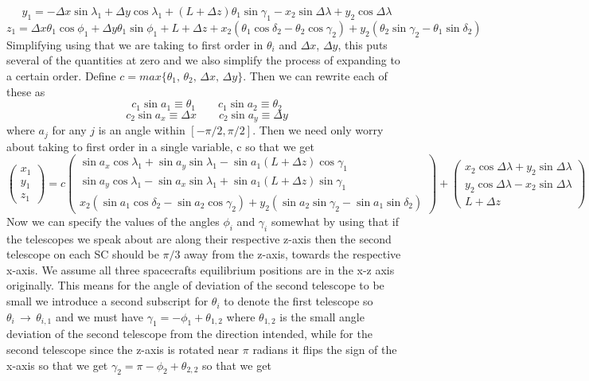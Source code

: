 \documentclass[11pt]{amsart}
\makeatletter
\newcommand{\0}{\varnothing}		%
\DeclareMathOperator*{\goes}{\, \longrightarrow \,}		%
\newcommand{\eq}{\equiv}		%
\newcommand{\1}{!}
\newcommand{\2}{@}
\newcommand{\3}{\#}
\newcommand{\4}{\$}
\newcommand{\5}{\%}
\newcommand{\6}{$^\wedge$}
\newcommand{\7}{\&}
\newcommand{\8}{*}
\newcommand{\9}{(}
\makeatother
\begin{document}
\[
y_1 = -\Delta x\sin \lambda_1+\Delta y \cos \lambda_1+\left(L+\Delta z\right)\theta_1\sin \gamma_1-x_2\sin \Delta \lambda + y_2\cos \Delta \lambda
\]
\[
z_1 = \Delta x\theta_1\cos \phi_1+\Delta y\theta_1\sin\phi_1+L+\Delta z+x_2\left(\theta_1\cos\delta_2-\theta_2\cos\gamma_2\right)+y_2\left(\theta_2\sin\gamma_2-\theta_1\sin\delta_2\right)
\]
Simplifying using that we are taking to first order in $\theta_i$ and $\Delta x$, $\Delta y$, this puts several of the quantities at zero and we also simplify the process of expanding to a certain order. Define $c = max\{\theta_1,\,\theta_2,\,\Delta x,\,\Delta y\}$. Then we can rewrite each of these as
\[
c_1\sin a_1 \eq \theta_1\qquad c_1\sin a_2 \eq \theta_2
\]
\[
c_2\sin a_x  \eq \Delta x \qquad c_2\sin a_y \eq \Delta y
\]
where $a_j$ for any $j$ is an angle within $[-\pi/2,\pi/2]$. Then we need only worry about taking to first order in a single variable, c so that we get
\[
\begin{pmatrix}
x_1
\\
y_1
\\
z_1
\end{pmatrix}
=c\begin{pmatrix}
\sin a_x\cos \lambda_1 + \sin a_y \sin \lambda_1- \sin a_1 \left(L+\Delta z\right)\cos \gamma_1 
\\
\sin a_y\cos \lambda_1-\sin a_x \sin \lambda_1+\sin a_1\left(L+\Delta z\right)\sin \gamma_1
\\
 x_2\left(\sin a_1\cos \delta_2-\sin a_2\cos \gamma_2\right) + y_2\left(\sin a_2 \sin \gamma_2 - \sin a_1\sin \delta_2\right)
\end{pmatrix}
+\begin{pmatrix}
 x_2\cos \Delta \lambda + y_2\sin \Delta \lambda
 \\
 y_2\cos \Delta \lambda - x_2\sin \Delta \lambda
 \\
 L+\Delta z
\end{pmatrix}
\]
Now we can specify the values of the angles $\phi_i$ and $\gamma_i$ somewhat by using that if the telescopes we speak about are along their respective z-axis then the second telescope on each SC should be $\pi/3$ away from the z-axis, towards the respective x-axis. We assume all three spacecrafts equilibrium positions are in the x-z axis originally. This means for the angle of deviation of the second telescope to be small we introduce a second subscript for $\theta_i$ to denote the first telescope so $\theta_i \goes \theta_{i,1}$ and we must have $\gamma_1= -\phi_1 + \theta_{1,2}$ where $\theta_{1,2}$ is the small angle deviation of the second telescope from the direction intended, while for the second telescope since the z-axis is rotated near $\pi$ radians it flips the sign of the x-axis so that we get $\gamma_2 = \pi - \phi_2+\theta_{2,2}$ so that we get
\end{document}
